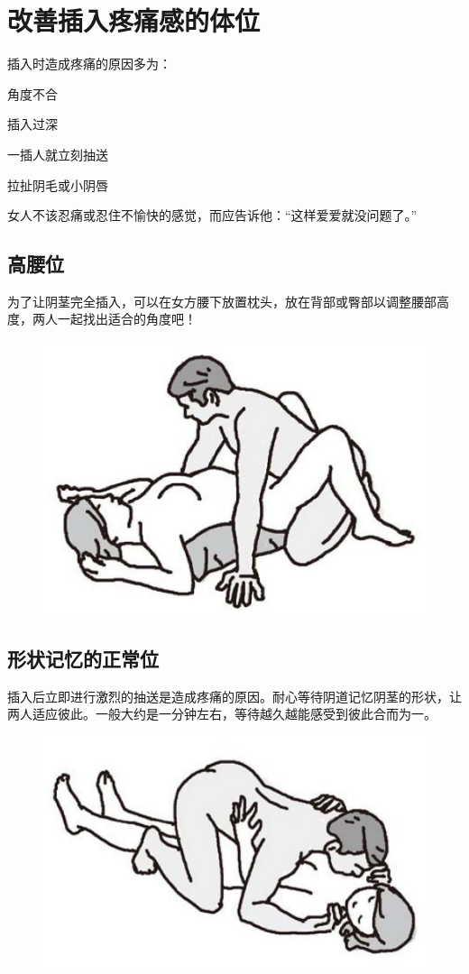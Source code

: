 \documentclass[12pt,UTF8]{ctexbook}
\begin{document}
\section{改善插入疼痛感的体位}

插入时造成疼痛的原因多为：

角度不合

插入过深

一插人就立刻抽送

拉扯阴毛或小阴唇

女人不该忍痛或忍住不愉快的感觉，而应告诉他：“这样爱爱就没问题了。”

\subsection{高腰位}

为了让阴茎完全插入，可以在女方腰下放置枕头，放在背部或臀部以调整腰部高度，两人一起找出适合的角度吧！

\begin{figure}[htbp]
	\centering
	\includegraphics[width=0.7\linewidth]{tw17}
	\caption{}
	\label{fig:1}
\end{figure}

\subsection{形状记忆的正常位}

插入后立即进行激烈的抽送是造成疼痛的原因。耐心等待阴道记忆阴茎的形状，让两人适应彼此。一般大约是一分钟左右，等待越久越能感受到彼此合而为一。

\begin{figure}[htbp]
	\centering
	\includegraphics[width=0.7\linewidth]{tw18}
	\caption{}
	\label{fig:1}
\end{figure}
\end{document}
